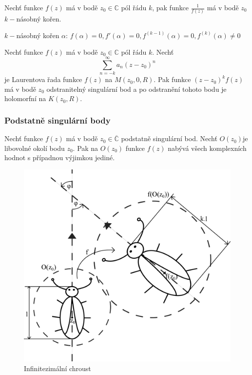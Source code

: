 \begin{theorem}
Nechť funkce $f(z)$ má v bodě $z_0\in\mathbb{C}$ pól řádu $k$, pak funkce $\frac{1}{f(z)}$ má v bodě $z_0$ $k-$násobný kořen.
\end{theorem}

$k-$násobný kořen $\alpha$: $f(\alpha)=0,f'(\alpha)=0,f^{(k-1)}(\alpha)=0,f^{(k)}(\alpha)\neq 0$

\begin{theorem}
Nechť funkce $f(z)$ má v bodě $z_0\in\mathbb{C}$ pól řádu $k$. Nechť $$\sum_{n=-k}^{\infty}a_n(z-z_0)^n$$ je Laurentova řada funkce $f(z)$ na $M(z_0,0,R)$. Pak funkce $(z-z_0)^kf(z)$ má v bodě $z_0$ odstranitelný singulární bod a po odstranění tohoto bodu je holomorfní na $K(z_0,R)$.
\end{theorem}

\subsubsection{Podstatně singulární body}
\begin{theorem}[Picard]
Nechť funkce $f(z)$ má v bodě $z_0\in\overline{\mathbb{C}}$ podstatně singulární bod. Nechť $O(z_0)$je libovolné okolí bodu $z_0$. Pak na $O(z_0)$ funkce $f(z)$ nabývá všech komplexních hodnot s případnou výjimkou jediné.
\end{theorem}

\begin{figure}[H]
\includegraphics[scale=0.25]{Obrazky/Chroust.png}
\caption{Infinitezimální chroust}
\end{figure}


